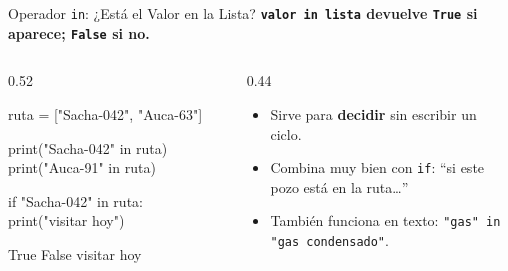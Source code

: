 \documentclass[aspectratio=169, 11pt]{beamer}
\begin{document}
\begin{frame}[fragile,shrink=20]{Operador \texttt{in}: ¿Está el Valor en la Lista?}
  \vspace{-4pt}
  {\small\color{arcaDark}\bfseries
    \texttt{valor in lista} devuelve \texttt{True} si aparece; \texttt{False} si no.}

  \vspace{5pt}
  \begin{columns}[T]
    \begin{column}{0.52\textwidth}
      \begin{pyblock}
ruta = ["Sacha-042", "Auca-63"]

print("Sacha-042" in ruta)
print("Auca-91" in ruta)

if "Sacha-042" in ruta:
    print("visitar hoy")
      \end{pyblock}
      \vspace{2pt}
      \begin{outputblock}
True
False
visitar hoy
      \end{outputblock}
    \end{column}

    \begin{column}{0.44\textwidth}
      {\scriptsize\color{textMuted}
      \begin{itemize}\setlength{\itemsep}{5pt}
        \item[{\color{arcaRed}\scriptsize\faArrowRight}]
          Sirve para \textbf{decidir} sin escribir
          un ciclo.
        \item[{\color{arcaRed}\scriptsize\faArrowRight}]
          Combina muy bien con \texttt{if}:
          ``si este pozo está en la ruta\ldots''
        \item[{\color{arcaRed}\scriptsize\faArrowRight}]
          También funciona en texto:
          \texttt{"gas" in "gas condensado"}.
      \end{itemize}
      }
    \end{column}
  \end{columns}
\end{frame}
\end{document}

